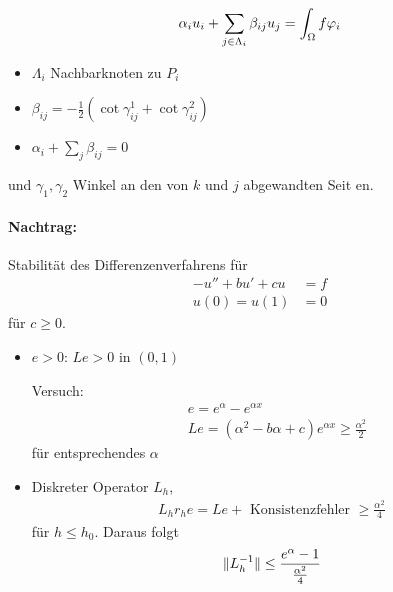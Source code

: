 \begin{align*}
  \alpha_i u_i + \sum_{j \in \Lambda_i}\beta_{ij}u_j = \int_\Omega f \varphi_i
\end{align*}
\begin{itemize}
\item $   \Lambda_i $ Nachbarknoten zu $P_i$
\item $\beta_{ij} = - \frac 1 2(\cot \gamma_{ij}^1 + \cot \gamma_{ij}^2)$
\item $\alpha_i + \sum_j \beta_{ij} = 0$ 
\end{itemize}
und $\gamma_1, \gamma_2$ Winkel an den von $k$ und $j$ abgewandten Seit
en.

\paragraph{Nachtrag:} Stabilität des Differenzenverfahrens für
\begin{align*}
  - u''+ b u' + cu &= f\\
u(0) = u(1) &= 0
\end{align*} 
für $c \geq 0$.
\begin{itemize}
\item $e >0$: $Le> 0$ in $(0,1)$

Versuch: 
\begin{align*}
&  e = e^\alpha - e^{\alpha x}\\
&  Le = (\alpha^2 - b \alpha + c) e^{\alpha x} \geq \frac{\alpha^2}2 
\end{align*}
für entsprechendes $\alpha$
\item Diskreter Operator $L_h$, 
  \begin{align*}
    L_h r_h e = Le + \text{ Konsistenzfehler } \geq \frac{\alpha^2} 4 
  \end{align*}
für $h \leq h_0$. Daraus folgt
\begin{align*}
  \|L_h^{-1}\| \leq \frac{e^\alpha-1}{\frac {\alpha^2} 4}
\end{align*}
\end{itemize}

